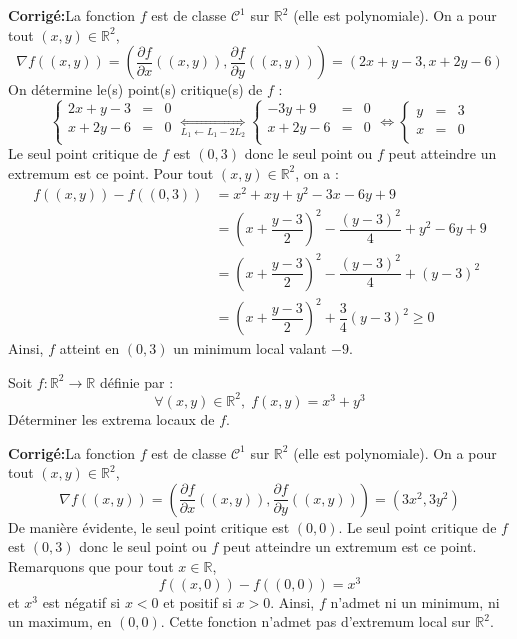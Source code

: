 \documentclass[a4paper,twoside,french,11pt]{VcCours}
\newcommand{\corr}{\textbf{Corrigé:}}
\begin{document}
\corr La fonction $f$ est de classe $\mathcal{C}^1$ sur $\mathbb{R}^2$ (elle est polynomiale). On a pour tout $(x,y) \in \mathbb{R}^2$,
$$ \nabla f ((x,y)) = \left( \dfrac{\partial f}{\partial x} ((x,y)),  \dfrac{\partial f}{\partial y} ((x,y)) \right) = (2x+y-3,x+2y-6)$$
On détermine le(s) point(s) critique(s) de $f$ :
$$ \left\lbrace \begin{array}{ccl}
2x+y-3 & = &0 \\
x+2y-6 & =& 0 \\
\end{array}\right. \underset{L_1 \leftarrow L_1-2L_2}{\Longleftrightarrow}\left\lbrace \begin{array}{ccl}
-3y+9 & =& 0 \\
x+2y-6 & =& 0 \\
\end{array}\right. \Longleftrightarrow \left\lbrace \begin{array}{ccl}
y & = & 3 \\
x & =  & 0 \\
\end{array}\right.$$
Le seul point critique de $f$ est $(0,3)$ donc le seul point ou $f$ peut atteindre un extremum est ce point. Pour tout $(x,y) \in \mathbb{R}^2$, on a :
\begin{align*}
 f((x,y)) - f((0,3)) & = x^{2} + xy + y^{2} - 3x - 6y + 9 \\
 & = \left( x + \dfrac{y-3}{2} \right)^2 - \dfrac{(y-3)^2}{4} + y^2-6y+9 \\
 & = \left( x + \dfrac{y-3}{2} \right)^2 - \dfrac{(y-3)^2}{4} + (y-3)^2 \\
 & = \left( x + \dfrac{y-3}{2} \right)^2 + \dfrac{3}{4} (y-3)^2 \geq 0
 \end{align*}
 Ainsi, $f$ atteint en $(0,3)$ un minimum local valant $-9$.
 
 
 \begin{Exercice}{} Soit $f : \mathbb{R}^2 \rightarrow \mathbb{R}$ définie par :
$$ \forall (x,y) \in \mathbb{R}^2, \; f(x,y) = x^3+y^3$$
Déterminer les extrema locaux de $f$.
\end{Exercice}

\corr La fonction $f$ est de classe $\mathcal{C}^1$ sur $\mathbb{R}^2$ (elle est polynomiale). On a pour tout $(x,y) \in \mathbb{R}^2$,
$$ \nabla f ((x,y)) = \left( \dfrac{\partial f}{\partial x} ((x,y)),  \dfrac{\partial f}{\partial y} ((x,y)) \right) = (3x^2,3y^2)$$
De manière évidente, le seul point critique est $(0,0)$. Le seul point critique de $f$ est $(0,3)$ donc le seul point ou $f$ peut atteindre un extremum est ce point. Remarquons que pour tout $x \in \mathbb{R}$,
$$ f((x,0))-f((0,0)) = x^3$$
et $x^3$ est négatif si $x<0$ et positif si $x>0$. Ainsi, $f$ n'admet ni un minimum, ni un maximum, en $(0,0)$. Cette fonction n'admet pas d'extremum local sur $\mathbb{R}^2$.
 
\end{document}

